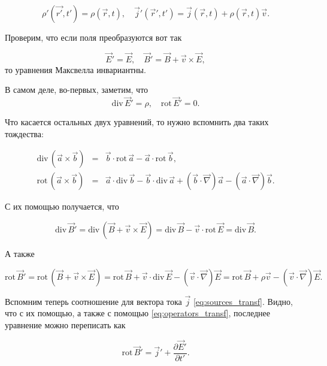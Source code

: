 \documentclass[12pt]{article}
\newcommand{\nn}{\nonumber}
\newcommand{\pt}{\partial}
\newcommand{\rot}{\mathrm{rot}\,}
\renewcommand{\div}{\mathrm{div}\,}
\newcommand{\vn}{\vec{\nabla}}
\begin{document}
\begin{equation}
  \label{eq:sources_transf}
  \rho' (\vec{r'},t') = \rho (\vec{r},t), \quad \vec{j}' (\vec{r}',t')
  = \vec{j} (\vec{r},t) + \rho(\vec{r},t) \vec{v}.
\end{equation}

Проверим, что если поля преобразуются вот так

\begin{equation}
  \label{eq:fields_transf}
  \vec{E}' = \vec{E}, \quad \vec{B}' = \vec{B} + \vec{v} \times \vec{E},
\end{equation}
то уравнения Максвелла инвариантны. 

В самом деле, во-первых, заметим, что 
\begin{equation}
  \label{eq:two_maxwell}
  \div \vec{E}' = \rho, \quad \rot \vec{E}' =0. 
\end{equation}

Что касается остальных двух уравнений, то нужно вспомнить два таких
тождества: 

\begin{eqnarray}
  \label{eq:two_identities}
\nn
  \div (\vec{a} \times \vec{b}) &=& \vec{b} \cdot \rot \vec{a} -
  \vec{a} \cdot \rot \vec{b},\\
\rot (\vec{a} \times \vec{b}) &=& \vec{a} \cdot \div \vec{b} - \vec{b}
\cdot \div \vec{a} + (\vec{b} \cdot \vn)\vec{a} - (\vec{a}\cdot \vn)\vec{b}.
\end{eqnarray}

С их помощью получается, что

\begin{equation}
  \div \vec{B}'	= \div(\vec{B}+\vec{v}\times \vec{E}) = \div \vec{B} -
  \vec{v} \cdot \rot \vec{E} = \div \vec{B}.
\end{equation}

А также

\begin{equation}
  \rot \vec{B}' = \rot (\vec{B} + \vec{v} \times \vec{E}) = \rot
  \vec{B} + \vec{v} \cdot \div \vec{E} - (\vec{v}\cdot\vn)\vec{E} =
  \rot \vec{B} +  \rho \vec{v}  - (\vec{v} \cdot \vn) \vec{E}.
\end{equation}

Вспомним теперь соотношение для вектора тока $\vec{j}$
\eqref{eq:sources_transf}. Видно, что с их помощью, а также с помощью
\eqref{eq:operators_transf}, последнее уравнение можно переписать как

\begin{equation}
  \rot \vec{B}'	= \vec{j}' + \frac{\pt \vec{E}'}{\pt t'}.
\end{equation}
\end{document}

